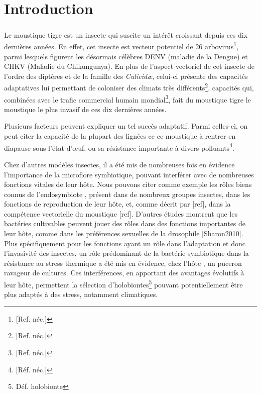 \chapter{Introduction}

\paragraph{}

Le moustique tigre  est un insecte qui suscite un intérêt croissant depuis ces dix dernières années.
En effet, cet insecte est vecteur potentiel de 26 arbovirus\footnote{[Ref. néc.]}, parmi lesquels figurent les désormais célèbres DENV (maladie de la Dengue) et CHKV (Maladie du Chikungunya).
En plus de l'aspect vectoriel de cet insecte de l'ordre des diptères et de la famille des \textit{Culicidæ}, celui-ci présente des capacités adaptatives lui permettant de coloniser des climats très différents\footnote{[Ref. néc.]}, capacités qui, combinées avec le trafic commercial humain mondial\footnote{[Ref. néc.]}, fait du moustique tigre le moustique le plus invasif de ces dix dernières années.

Plusieurs facteurs peuvent expliquer un tel succès adaptatif. Parmi celles-ci, on peut citer la capacité de la plupart des lignées ce ce moustique à rentrer en diapause sous l'état d'\oe{}uf, ou sa résistance importante à divers polluants\footnote{[Réf. néc.]}.

Chez d'autres modèles insectes, il a été mis de nombreuses fois en évidence l'importance de la microflore symbiotique, pouvant interférer avec de nombreuses fonctions vitales de leur hôte.
Nous pouvons citer comme exemple les rôles biens connus de l'endosymbiote , présent dans de nombreux groupes insectes, dans les fonctions de reproduction de leur hôte, et, comme décrit par [ref], dans la compétence vectorielle du moustique [ref].
D'autres études montrent que les bactéries cultivables peuvent jouer des rôles dans des fonctions importantes de leur hôte, comme  dans les préférences sexuelles de la drosophile [Sharon2010].
Plus spécifiquement pour les fonctions ayant un rôle dans l'adaptation et donc l'invasivité des insectes, un rôle prédominant de la bactérie symbiotique  dans la résistance au stress thermique a été mis en évidence, chez l'hôte , un puceron ravageur de cultures.
Ces interférences, en apportant des avantages évolutifs à leur hôte, permettent la sélection d'holobiontes\footnote{Déf. holobionte} pouvant potentiellement être plus adaptés à des stress, notamment climatiques.

